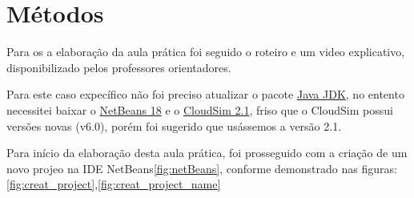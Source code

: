 \section{Métodos}
\par Para os a elaboração da aula prática foi seguido o roteiro e um video explicativo, disponibilizado pelos professores orientadores.
\par Para este caso expecífico não foi preciso atualizar o pacote \href{https://www.oracle.com/java/technologies/downloads/}{Java JDK}, no entento necessitei baixar o \href{https://netbeans.apache.org/download/nb19/}{NetBeans 18} e o \href{https://github.com/Cloudslab/cloudsim/releases}{CloudSim 2.1}, friso que o CloudSim possui versões novas (v6.0), porém foi sugerido que usássemos a versão 2.1.

\par Para início da elaboração desta aula prática, foi prosseguido com a criação de um novo projeo na IDE NetBeans\ref{fig:netBeans}, conforme demonstrado nas figuras:\ref{fig:creat_project},\ref{fig:creat_project_name}

